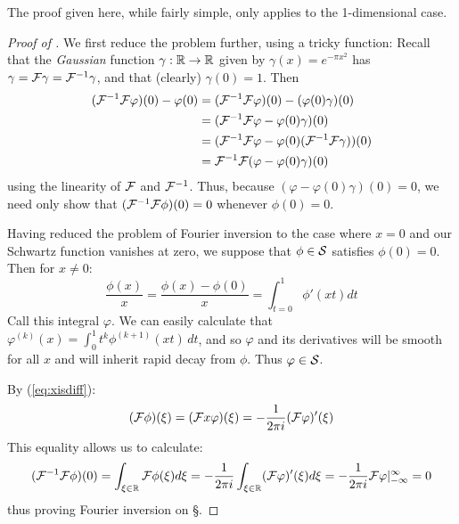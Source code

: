       \begin{rmk}
        The proof given here, while fairly simple, only applies to the 1-dimensional case. 
      \end{rmk}
      \begin{proof}[Proof of ]
        We first reduce the problem further, using a tricky function:
        Recall that the \emph{Gaussian} function $\gamma:\R\rightarrow\R$ given by $\gamma(x) = e^{-\pi x^2}$ has $\gamma=\F\gamma=\F^{-1}\gamma$, and that (clearly) $\gamma(0)=1$.
        Then 
        \begin{align*}
          (\F^{-1}\F\varphi)(0) - \varphi(0) &= (\F^{-1}\F\varphi)(0) - (\varphi(0)\gamma)(0)\\
          &= (\F^{-1}\F\varphi - \varphi(0)\gamma)(0)\\
          &= (\F^{-1}\F\varphi - \varphi(0)(\F^{-1}\F\gamma))(0)\\
          &= \F^{-1}\F(\varphi-\varphi(0)\gamma)(0)
        \end{align*}
        using the linearity of $\F$ and $\F^{-1}$.
        Thus, because $(\varphi-\varphi(0)\gamma)(0)=0$, we need only show that $(\F^{-1}\F\phi)(0) = 0$ whenever $\phi(0)=0$.

        Having reduced the problem of Fourier inversion to the case where $x=0$ and our Schwartz function vanishes at zero, we suppose that $\phi\in\S$ satisfies $\phi(0)=0$. 
        Then for $x\ne0$:
        \begin{equation*}
          \frac{\phi(x)}{x} = \frac{\phi(x)-\phi(0)}{x} = \int_{t=0}^1 \phi'(xt)dt
        \end{equation*}
        Call this integral $\varphi$.
        We can easily calculate that $\varphi^{(k)}(x) = \int_0^1t^k\phi^{(k+1)}(xt)\,dt$, and so $\varphi$ and its derivatives will be smooth for all $x$ and will inherit rapid decay from $\phi$.
        Thus $\varphi\in\S$.

        By (\ref{eq:xisdiff}):
        \begin{equation*}
          (\F\phi)(\xi) = (\F x\varphi)(\xi)= -\frac{1}{2\pi i}(\F\varphi)'(\xi)
        \end{equation*}
        This equality allows us to calculate:
        \begin{equation*}
          (\F^{-1}\F\phi)(0) = \int_{\xi\in\R} \F\phi(\xi)d\xi = -\frac{1}{2\pi i}\int_{\xi\in\R} (\F\varphi)'(\xi)d\xi = -\frac{1}{2\pi i} \F\varphi\vert_{-\infty}^\infty = 0
        \end{equation*}
        thus proving Fourier inversion on \S.
      \end{proof}

